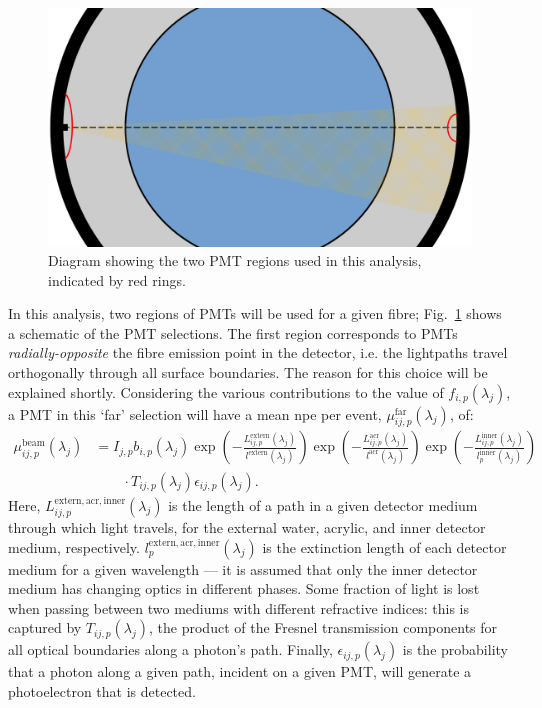 \begin{figure}
    \centering
    \includegraphics[width=\textwidth]{5_SMELLIEAnalysis/images/smellie_ext_length_pmt_selection_schematic.pdf}
    \caption[Diagram showing the two PMT regions used in the SMELLIE extinction length analysis]
    {Diagram showing the two PMT regions used in this analysis, indicated by red rings.}
    \label{fig:smellie_ext_length_schematic}
\end{figure}

In this analysis, two regions of PMTs will be used for a given fibre; Fig.~\ref{fig:smellie_ext_length_schematic} shows a schematic of the PMT selections. The first region corresponds to PMTs \textit{radially-opposite} the fibre emission point in the detector, i.e. the lightpaths travel orthogonally through all surface boundaries. The reason for this choice will be explained shortly. Considering the various contributions to the value of $f_{i,p}(\lambda_{j})$, a PMT in this `far' selection will have a mean npe per event, $\mu_{ij,p}^{\mathrm{far}}(\lambda_{j})$, of:
\begin{align}\label{eq:smellie_ext_length_theory}
    \mu_{ij,p}^{\mathrm{beam}}(\lambda_{j}) &= I_{j,p}b_{i,p}(\lambda_{j})
    \exp\left(
        -\frac{L_{ij,p}^{\mathrm{extern}}(\lambda_{j})}{l^{\mathrm{extern}}(\lambda_{j})}
    \right)
    \exp\left(
        -\frac{L_{ij,p}^{\mathrm{acr}}(\lambda_{j})}{l^{\mathrm{acr}}(\lambda_{j})}
    \right)
    \exp\left(
        -\frac{L_{ij,p}^{\mathrm{inner}}(\lambda_{j})}{l_{p}^{\mathrm{inner}}(\lambda_{j})}
    \right)\nonumber\\
    & \qquad\cdot T_{ij,p}(\lambda_{j})\epsilon_{ij,p}(\lambda_{j}).
\end{align}
Here, $L_{ij,p}^{\mathrm{extern,acr,inner}}(\lambda_{j})$ is the length of a path in a given detector medium through which light travels, for the external water, acrylic, and inner detector medium, respectively. $l_{p}^{\mathrm{extern,acr,inner}}(\lambda_{j})$ is the extinction length of each detector medium for a given wavelength --- it is assumed that only the inner detector medium has changing optics in different phases. Some fraction of light is lost when passing between two mediums with different refractive indices: this is captured by $T_{ij,p}(\lambda_{j})$, the product of the Fresnel transmission components for all optical boundaries along a photon's path. Finally, $\epsilon_{ij,p}(\lambda_{j})$ is the probability that a photon along a given path, incident on a given PMT, will generate a photoelectron that is detected. 

